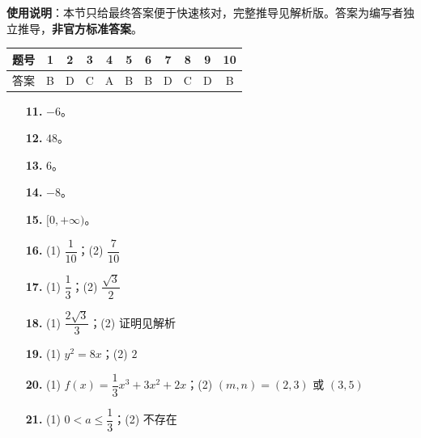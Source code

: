 
\begin{gknotice}
\textbf{使用说明}：本节只给最终答案便于快速核对，完整推导见解析版。答案为编写者独立推导，\textbf{非官方标准答案}。
\end{gknotice}

\begin{center}\begin{tabular}{ccccccccccc}
\toprule
题号 & 1 & 2 & 3 & 4 & 5 & 6 & 7 & 8 & 9 & 10 \\
\midrule
答案 & B & D & C & A & B & B & D & C & D & B \\
\bottomrule
\end{tabular}\end{center}

\begin{itemize}[leftmargin=2.6em]
  \item[\textbf{11.}] $-6$。
  \item[\textbf{12.}] $48$。
  \item[\textbf{13.}] $6$。
  \item[\textbf{14.}] $-8$。
  \item[\textbf{15.}] $[0,+\infty)$。
\end{itemize}

\begin{itemize}[leftmargin=2.6em]
  \item[\textbf{16.}] (1) $\dfrac1{10}$；(2) $\dfrac7{10}$
  \item[\textbf{17.}] (1) $\dfrac13$；(2) $\dfrac{\sqrt3}2$
  \item[\textbf{18.}] (1) $\dfrac{2\sqrt3}3$；(2) 证明见解析
  \item[\textbf{19.}] (1) $y^2=8x$；(2) $2$
  \item[\textbf{20.}] (1) $f(x)=\dfrac13x^3+3x^2+2x$；(2) $(m,n)=(2,3)$ 或 $(3,5)$
  \item[\textbf{21.}] (1) $0<a\leqslant\dfrac13$；(2) 不存在
\end{itemize}
